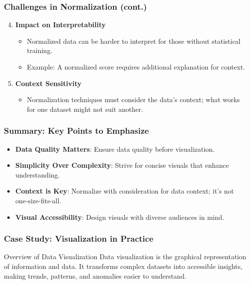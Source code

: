 \documentclass[aspectratio=169]{beamer}
\begin{document}
\begin{frame}[fragile]
    \frametitle{Challenges in Normalization (cont.)}
    \begin{enumerate}
        \setcounter{enumi}{3}
        \item \textbf{Impact on Interpretability}
            \begin{itemize}
                \item Normalized data can be harder to interpret for those without statistical training.
                \item Example: A normalized score requires additional explanation for context.
            \end{itemize}

        \item \textbf{Context Sensitivity}
            \begin{itemize}
                \item Normalization techniques must consider the data's context; what works for one dataset might not suit another.
            \end{itemize}
    \end{enumerate}
\end{frame}

\begin{frame}[fragile]
    \frametitle{Summary: Key Points to Emphasize}
    \begin{itemize}
        \item \textbf{Data Quality Matters}: Ensure data quality before visualization.
        \item \textbf{Simplicity Over Complexity}: Strive for concise visuals that enhance understanding.
        \item \textbf{Context is Key}: Normalize with consideration for data context; it's not one-size-fits-all.
        \item \textbf{Visual Accessibility}: Design visuals with diverse audiences in mind.
    \end{itemize}
\end{frame}

\begin{frame}[fragile]
    \frametitle{Case Study: Visualization in Practice}
    \begin{block}{Overview of Data Visualization}
        Data visualization is the graphical representation of information and data. 
        It transforms complex datasets into accessible insights, making trends, patterns, 
        and anomalies easier to understand.
    \end{block}
\end{frame}
\end{document}

